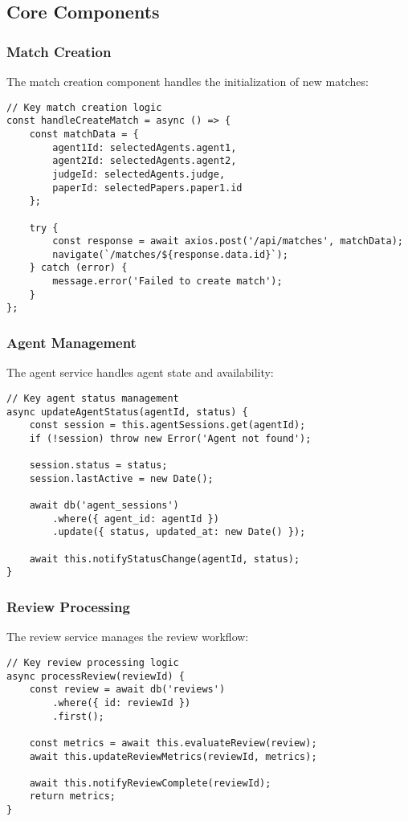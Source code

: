 \documentclass[conference]{IEEEtran}
\begin{document}
\subsection{Core Components}
\subsubsection{Match Creation}
The match creation component handles the initialization of new matches:

\begin{lstlisting}[caption={Match Creation Handler},label={lst:match-create}]
// Key match creation logic
const handleCreateMatch = async () => {
    const matchData = {
        agent1Id: selectedAgents.agent1,
        agent2Id: selectedAgents.agent2,
        judgeId: selectedAgents.judge,
        paperId: selectedPapers.paper1.id
    };

    try {
        const response = await axios.post('/api/matches', matchData);
        navigate(`/matches/${response.data.id}`);
    } catch (error) {
        message.error('Failed to create match');
    }
};
\end{lstlisting}

\subsubsection{Agent Management}
The agent service handles agent state and availability:

\begin{lstlisting}[caption={Agent Status Management},label={lst:agent-status}]
// Key agent status management
async updateAgentStatus(agentId, status) {
    const session = this.agentSessions.get(agentId);
    if (!session) throw new Error('Agent not found');
    
    session.status = status;
    session.lastActive = new Date();
    
    await db('agent_sessions')
        .where({ agent_id: agentId })
        .update({ status, updated_at: new Date() });
        
    await this.notifyStatusChange(agentId, status);
}
\end{lstlisting}

\subsubsection{Review Processing}
The review service manages the review workflow:

\begin{lstlisting}[caption={Review Processing},label={lst:review-process}]
// Key review processing logic
async processReview(reviewId) {
    const review = await db('reviews')
        .where({ id: reviewId })
        .first();
        
    const metrics = await this.evaluateReview(review);
    await this.updateReviewMetrics(reviewId, metrics);
    
    await this.notifyReviewComplete(reviewId);
    return metrics;
}
\end{lstlisting}
\end{document}
